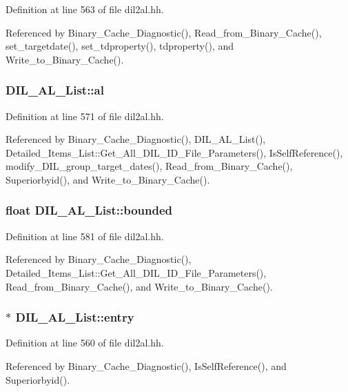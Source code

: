 Definition at line 563 of file dil2al.hh.

Referenced by Binary\_\-Cache\_\-Diagnostic(), Read\_\-from\_\-Binary\_\-Cache(), set\_\-targetdate(), set\_\-tdproperty(), tdproperty(), and Write\_\-to\_\-Binary\_\-Cache().
\subsubsection{ DIL\_\-AL\_\-List::al}\label{classDIL__AL__List_m0}




Definition at line 571 of file dil2al.hh.

Referenced by Binary\_\-Cache\_\-Diagnostic(), DIL\_\-AL\_\-List(), Detailed\_\-Items\_\-List::Get\_\-All\_\-DIL\_\-ID\_\-File\_\-Parameters(), Is\-Self\-Reference(), modify\_\-DIL\_\-group\_\-target\_\-dates(), Read\_\-from\_\-Binary\_\-Cache(), Superiorbyid(), and Write\_\-to\_\-Binary\_\-Cache().
\subsubsection{\setlength{\rightskip}{0pt plus 5cm}float DIL\_\-AL\_\-List::bounded}\label{classDIL__AL__List_m3}




Definition at line 581 of file dil2al.hh.

Referenced by Binary\_\-Cache\_\-Diagnostic(), Detailed\_\-Items\_\-List::Get\_\-All\_\-DIL\_\-ID\_\-File\_\-Parameters(), Read\_\-from\_\-Binary\_\-Cache(), and Write\_\-to\_\-Binary\_\-Cache().
\subsubsection{$\ast$ DIL\_\-AL\_\-List::entry\hspace{0.3cm}{\tt  [protected]}}\label{classDIL__AL__List_n0}




Definition at line 560 of file dil2al.hh.

Referenced by Binary\_\-Cache\_\-Diagnostic(), Is\-Self\-Reference(), and Superiorbyid().
